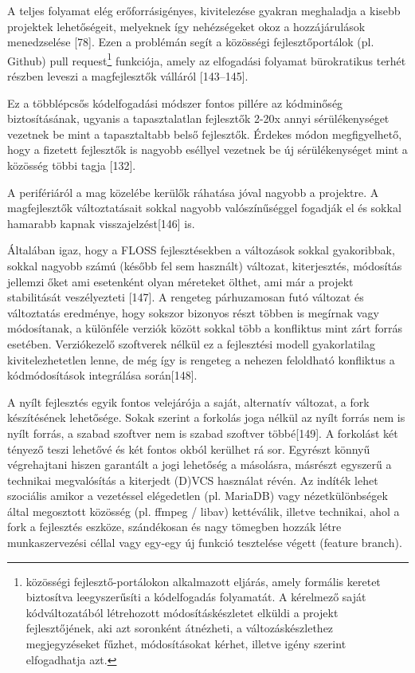 \documentclass[12pt,magyar,a4paper,oneside]{scrreprt}
\begin{document}
A teljes folyamat elég erőforrásigényes, kivitelezése gyakran meghaladja
a kisebb projektek lehetőségeit, melyeknek így nehézségeket okoz a
hozzájárulások menedzselése {[}78{]}. Ezen a problémán segít a közösségi
fejlesztőportálok (pl. Github) pull request\footnote{közösségi
  fejlesztő-portálokon alkalmazott eljárás, amely formális keretet
  biztosítva leegyszerűsíti a kódelfogadás folyamatát. A kérelmező saját
  kódváltozatából létrehozott módosításkészletet elküldi a projekt
  fejlesztőjének, aki azt soronként átnézheti, a változáskészlethez
  megjegyzéseket fűzhet, módosításokat kérhet, illetve igény szerint
  elfogadhatja azt.} funkciója, amely az elfogadási folyamat
bürokratikus terhét részben leveszi a magfejlesztők válláról
{[}143--145{]}.

Ez a többlépcsős kódelfogadási módszer fontos pillére az kódminőség
biztosításának, ugyanis a tapasztalatlan fejlesztők 2-20x annyi
sérülékenységet vezetnek be mint a tapasztaltabb belső fejlesztők.
Érdekes módon megfigyelhető, hogy a fizetett fejlesztők is nagyobb
eséllyel vezetnek be új sérülékenységet mint a közösség többi tagja
{[}132{]}.

A perifériáról a mag közelébe kerülők ráhatása jóval nagyobb a
projektre. A magfejlesztők változtatásait sokkal nagyobb valószínűséggel
fogadják el és sokkal hamarabb kapnak visszajelzést{[}146{]} is.

Általában igaz, hogy a FLOSS fejlesztésekben a változások sokkal
gyakoribbak, sokkal nagyobb számú (később fel sem használt) változat,
kiterjesztés, módosítás jellemzi őket ami esetenként olyan méreteket
ölthet, ami már a projekt stabilitását veszélyezteti {[}147{]}. A
rengeteg párhuzamosan futó változat és változtatás eredménye, hogy
sokszor bizonyos részt többen is megírnak vagy módosítanak, a különféle
verziók között sokkal több a konfliktus mint zárt forrás esetében.
Verziókezelő szoftverek nélkül ez a fejlesztési modell gyakorlatilag
kivitelezhetetlen lenne, de még így is rengeteg a nehezen feloldható
konfliktus a kódmódosítások integrálása során{[}148{]}.

A nyílt fejlesztés egyik fontos velejárója a saját, alternatív változat,
a fork készítésének lehetősége. Sokak szerint a forkolás joga nélkül az
nyílt forrás nem is nyílt forrás, a szabad szoftver nem is szabad
szoftver többé{[}149{]}. A forkolást két tényező teszi lehetővé és két
fontos okból kerülhet rá sor. Egyrészt könnyű végrehajtani hiszen
garantált a jogi lehetőség a másolásra, másrészt egyszerű a technikai
megvalósítás a kiterjedt (D)VCS használat révén. Az indíték lehet
szociális amikor a vezetéssel elégedetlen (pl. MariaDB) vagy
nézetkülönbségek által megosztott közösség (pl. ffmpeg / libav)
kettéválik, illetve technikai, ahol a fork a fejlesztés eszköze,
szándékosan és nagy tömegben hozzák létre munkaszervezési céllal vagy
egy-egy új funkció tesztelése végett (feature branch).
\end{document}
